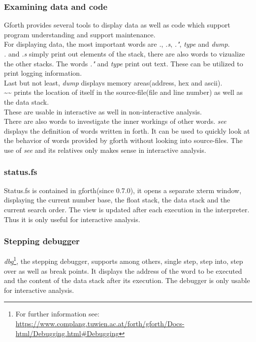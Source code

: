 \subsubsection*{Examining data and code}
Gforth provides several tools to display data as well as code which support program understanding and support maintenance.\\
For displaying data, the most important words are \emph{.}, \emph{.s}, \emph{."}, \emph{type} and \emph{dump}.\\
\emph{.} and \emph{.s} simply print out elements of the stack, there are also words to vizualize the other stacks.
The words \emph{."} and \emph{type} print out text. These can be utilized to print logging information.\\
Last but not least, \emph{dump} displays memory areas(address, hex and ascii).\\
\textasciitilde\textasciitilde\: prints the location of itself in the source-file(file and line number) as well as the data stack.\\
These are usable in interactive as well in non-interactive analysis.\\
There are also words to investigate the inner workings of other words. 
\emph{see} displays the definition of words written in forth. It can be used to quickly look at the behavior of words provided by gforth without looking into source-files. The use of \emph{see} and its relatives only makes sense in interactive analysis.

\subsubsection*{status.fs}
Status.fs is contained in gforth(since 0.7.0), it opens a separate xterm window, displaying the current number base, the float stack, the data stack and the current search order. The view is updated after each execution in the interpreter. Thus it is only useful for interactive analysis.

\subsubsection*{Stepping debugger}
\emph{dbg}\footnote{For further information see: \url{https://www.complang.tuwien.ac.at/forth/gforth/Docs-html/Debugging.html\#Debugging}}, the stepping debugger, supports among others, single step, step into, step over as well as break points. It displays the address of the word to be executed and the content of the data stack after its execution. The debugger is only usable for interactive analysis.

